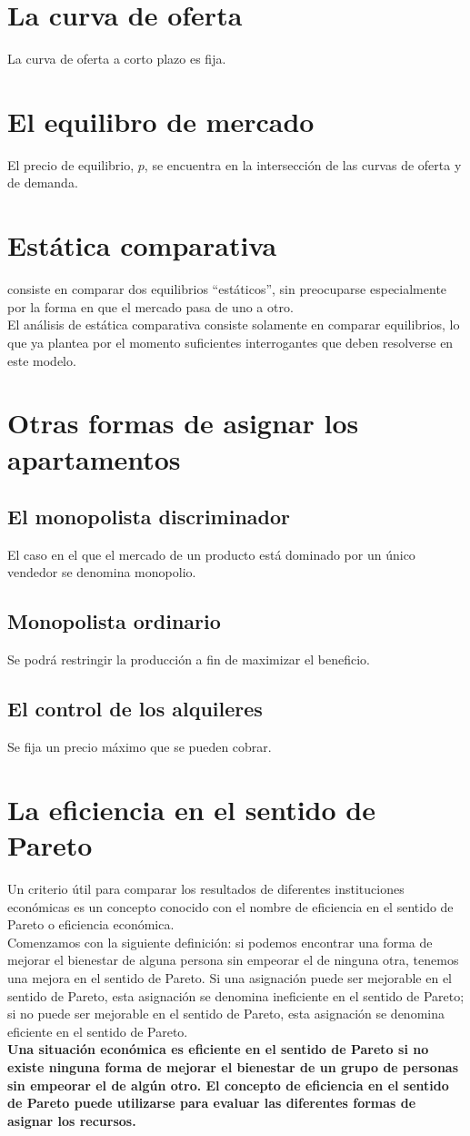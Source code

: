 \documentclass[10pt]{article}
\begin{document}
\section*{La curva de oferta}
La curva de oferta a corto plazo es fija.
\section*{El equilibro de mercado}
El precio de equilibrio, $p$, se encuentra en la intersección de las curvas de oferta y de demanda.
\section*{Estática comparativa}
consiste en comparar dos equilibrios “estáticos”, sin preocuparse especialmente por la forma en que el mercado pasa de uno a otro.\\
El análisis de estática comparativa consiste solamente en comparar equilibrios, lo que ya plantea por el momento suficientes interrogantes que deben resolverse en este modelo.
\section*{Otras formas de asignar los apartamentos}
\subsection*{El monopolista discriminador}
 El caso en el que el mercado de un producto está dominado por un único vendedor se denomina monopolio.\\
\subsection*{Monopolista ordinario}
Se podrá restringir la producción a fin de maximizar el beneficio.
\subsection*{El control de los alquileres}
Se fija un precio máximo que se pueden cobrar.
\section*{La eficiencia en el sentido de Pareto}
 Un criterio útil para comparar los resultados de diferentes instituciones económicas es un concepto conocido con el nombre de eficiencia en el sentido de Pareto o eficiencia económica.\\
 Comenzamos con la siguiente definición: si podemos encontrar una forma de mejorar el bienestar de alguna persona sin empeorar el de ninguna otra, tenemos una mejora en el sentido de Pareto. Si una asignación puede ser mejorable en el sentido de Pareto, esta asignación se denomina ineficiente en el sentido de Pareto; si no puede ser mejorable en el sentido de Pareto, esta asignación se denomina eficiente en el sentido de Pareto.\\
 \textbf{Una situación económica es eficiente en el sentido de Pareto si no existe ninguna forma de mejorar el bienestar de un grupo de personas sin empeorar el de algún otro. El concepto de eficiencia en el sentido de Pareto puede utilizarse para evaluar las diferentes formas de asignar los recursos.}
\end{document}
